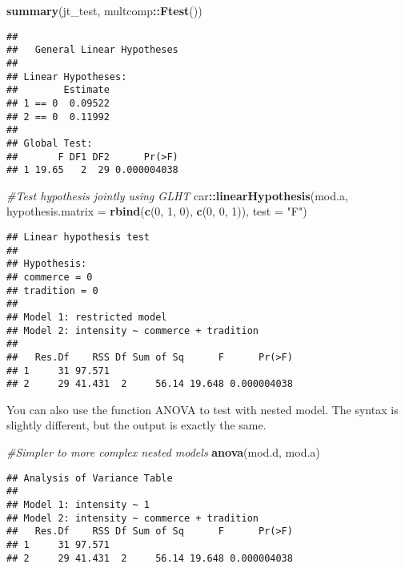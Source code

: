 \documentclass[]{book}
\newenvironment{Shaded}{\begin{snugshade}}{\end{snugshade}}
\newcommand{\CommentTok}[1]{\textcolor[rgb]{0.56,0.35,0.01}{\textit{#1}}}
\newcommand{\DataTypeTok}[1]{\textcolor[rgb]{0.13,0.29,0.53}{#1}}
\newcommand{\DecValTok}[1]{\textcolor[rgb]{0.00,0.00,0.81}{#1}}
\newcommand{\KeywordTok}[1]{\textcolor[rgb]{0.13,0.29,0.53}{\textbf{#1}}}
\newcommand{\NormalTok}[1]{#1}
\newcommand{\OperatorTok}[1]{\textcolor[rgb]{0.81,0.36,0.00}{\textbf{#1}}}
\newcommand{\StringTok}[1]{\textcolor[rgb]{0.31,0.60,0.02}{#1}}
\theoremstyle{definition}
\theoremstyle{definition}
\theoremstyle{definition}
\theoremstyle{remark}
\begin{document}
\begin{Shaded}
\begin{Highlighting}[]
\KeywordTok{summary}\NormalTok{(jt_test, multcomp}\OperatorTok{::}\KeywordTok{Ftest}\NormalTok{())}
\end{Highlighting}
\end{Shaded}

\begin{verbatim}
## 
##   General Linear Hypotheses
## 
## Linear Hypotheses:
##        Estimate
## 1 == 0  0.09522
## 2 == 0  0.11992
## 
## Global Test:
##       F DF1 DF2      Pr(>F)
## 1 19.65   2  29 0.000004038
\end{verbatim}

\begin{Shaded}
\begin{Highlighting}[]
\CommentTok{#Test hypothesis jointly using GLHT}
\NormalTok{car}\OperatorTok{::}\KeywordTok{linearHypothesis}\NormalTok{(mod.a, }\DataTypeTok{hypothesis.matrix =} \KeywordTok{rbind}\NormalTok{(}\KeywordTok{c}\NormalTok{(}\DecValTok{0}\NormalTok{, }\DecValTok{1}\NormalTok{, }\DecValTok{0}\NormalTok{), }\KeywordTok{c}\NormalTok{(}\DecValTok{0}\NormalTok{, }\DecValTok{0}\NormalTok{, }\DecValTok{1}\NormalTok{)), }\DataTypeTok{test =} \StringTok{"F"}\NormalTok{)}
\end{Highlighting}
\end{Shaded}

\begin{verbatim}
## Linear hypothesis test
## 
## Hypothesis:
## commerce = 0
## tradition = 0
## 
## Model 1: restricted model
## Model 2: intensity ~ commerce + tradition
## 
##   Res.Df    RSS Df Sum of Sq      F      Pr(>F)
## 1     31 97.571                                
## 2     29 41.431  2     56.14 19.648 0.000004038
\end{verbatim}

You can also use the function ANOVA to test with nested model. The syntax is slightly different, but the output is exactly the same.

\begin{Shaded}
\begin{Highlighting}[]
\CommentTok{#Simpler to more complex nested models}
\KeywordTok{anova}\NormalTok{(mod.d, mod.a)}
\end{Highlighting}
\end{Shaded}

\begin{verbatim}
## Analysis of Variance Table
## 
## Model 1: intensity ~ 1
## Model 2: intensity ~ commerce + tradition
##   Res.Df    RSS Df Sum of Sq      F      Pr(>F)
## 1     31 97.571                                
## 2     29 41.431  2     56.14 19.648 0.000004038
\end{verbatim}
\end{document}
